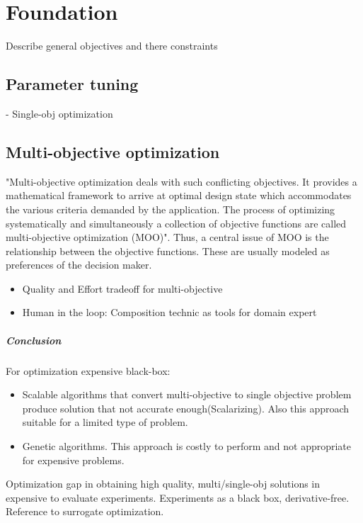 \chapter{Foundation}
    Describe general objectives and there constraints

    \section{Parameter tuning}
    - Single-obj optimization
    
    \section{Multi-objective optimization}
    "Multi-objective optimization deals with such conflicting objectives. It provides a
    mathematical framework to arrive at optimal design state which accommodates the various criteria demanded by
    the application. The process of optimizing systematically and simultaneously a collection of objective functions
    are called multi-objective optimization (MOO)\cite{odugod2013}".
    Thus, a central issue of MOO is the relationship between the objective functions. These are usually modeled as preferences of the decision maker.

    \begin{itemize}
        \item Quality and Effort tradeoff for multi-objective
        \item Human in the loop: Composition technic as tools for domain expert
    \end{itemize}

        \paragraph{Conclusion}
        For optimization expensive black-box:
        \begin{itemize}
            \item Scalable algorithms that convert multi-objective to single objective problem produce solution that not accurate enough(Scalarizing). Also this approach suitable for a limited type of problem.
            \item Genetic algorithms. This approach is costly to perform and not appropriate for expensive problems.
        \end{itemize}
        Optimization gap in obtaining high quality, multi/single-obj solutions in expensive to evaluate experiments.
        Experiments as a black box, derivative-free. Reference to surrogate optimization.

